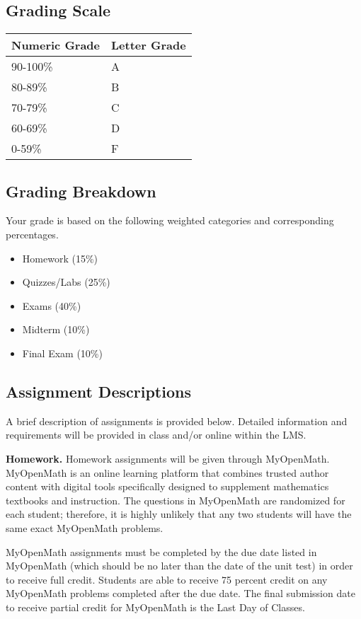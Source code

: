 \documentclass{article}
\begin{document}
\subsection{Grading Scale}

\bigskip\noindent
\begin{tabular}{p{}p{}}
\toprule
Numeric Grade & Letter Grade \\
\hline
90-100\% & A \\
80-89\% & B \\
70-79\% & C \\
60-69\% & D \\
0-59\% & F \\
\bottomrule
\end{tabular}

\bigskip\subsection{Grading Breakdown}

Your grade is based on the following weighted categories and corresponding percentages.

\begin{itemize}
\item Homework (15\%)
\item Quizzes/Labs (25\%)
\item Exams (40\%)
\item Midterm (10\%)
\item Final Exam (10\%)
\end{itemize}

\subsection{Assignment Descriptions}

A brief description of assignments is provided below. Detailed information and requirements will be provided in class and/or online within the LMS.

\textbf{Homework.} Homework assignments will be given through MyOpenMath. MyOpenMath is an online learning platform that combines trusted author content with digital tools specifically designed to supplement mathematics textbooks and instruction. The questions in MyOpenMath are randomized for each student; therefore, it is highly unlikely that any two students will have the same exact MyOpenMath problems.

MyOpenMath assignments must be completed by the due date listed in MyOpenMath (which should be no later than the date of the unit test) in order to receive full credit. Students are able to receive 75 percent credit on any MyOpenMath problems completed after the due date. The final submission date to receive partial credit for MyOpenMath is the Last Day of Classes.
\end{document}

